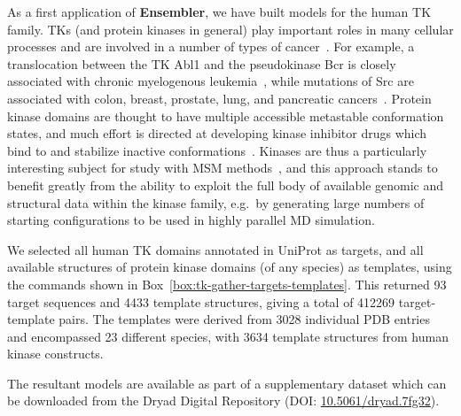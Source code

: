 \documentclass[aps,prl,preprint,nofootinbib,superscriptaddress,linenumbers]{revtex4-1}
\begin{document}
As a first application of {\bf Ensembler}, we have built models for the human TK family.
TKs (and protein kinases in general) play important roles in many cellular processes and are involved in a number of types of cancer~\cite{krause:nejm:2005:tks-cancer}.
For example, a translocation between the TK Abl1 and the pseudokinase Bcr is closely associated with chronic myelogenous leukemia~\cite{greuber:2013:abl-cancer-review}, while mutations of Src are associated with colon, breast, prostate, lung, and pancreatic cancers~\cite{kim:2009:src-cancer-review}.
Protein kinase domains are thought to have multiple accessible metastable conformation states, and much effort is directed at developing kinase inhibitor drugs which bind to and stabilize inactive conformations~\cite{liu:ncb:2006:kinase-inhibitors-inactive-conformations}.
Kinases are thus a particularly interesting subject for study with MSM methods~\cite{shukla-pande:nature-commun:2014:src-activation-msm}, and this approach stands to benefit greatly from the ability to exploit the full body of available genomic and structural data within the kinase family, e.g.~by generating large numbers of starting configurations to be used in highly parallel MD simulation.

We selected all human TK domains annotated in UniProt as targets, and all available structures of protein kinase domains (of any species) as templates, using the commands shown in Box~\ref{box:tk-gather-targets-templates}.
This returned 93 target sequences and 4433 template structures, giving a total of \num{412269} target-template pairs.
The templates were derived from 3028 individual PDB entries and encompassed 23 different species, with 3634 template structures from human kinase constructs.

The resultant models are available as part of a supplementary dataset which can be downloaded from the Dryad Digital Repository (DOI: \href{http://datadryad.org/review?doi=doi:10.5061/dryad.7fg32}{10.5061/dryad.7fg32}).
\end{document}
